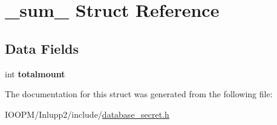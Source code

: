 \hypertarget{struct__sum__}{}\section{\+\_\+sum\+\_\+ Struct Reference}
\label{struct__sum__}
\subsection*{Data Fields}
\begin{DoxyCompactItemize}
\item 
\hypertarget{struct__sum___ae628245a3b1704096bb2100396bdc582}{}int {\bfseries totalmount}\label{struct__sum___ae628245a3b1704096bb2100396bdc582}

\end{DoxyCompactItemize}


The documentation for this struct was generated from the following file\+:\begin{DoxyCompactItemize}
\item 
I\+O\+O\+P\+M/\+Inlupp2/include/\hyperlink{database__secret_8h}{database\+\_\+secret.\+h}\end{DoxyCompactItemize}
